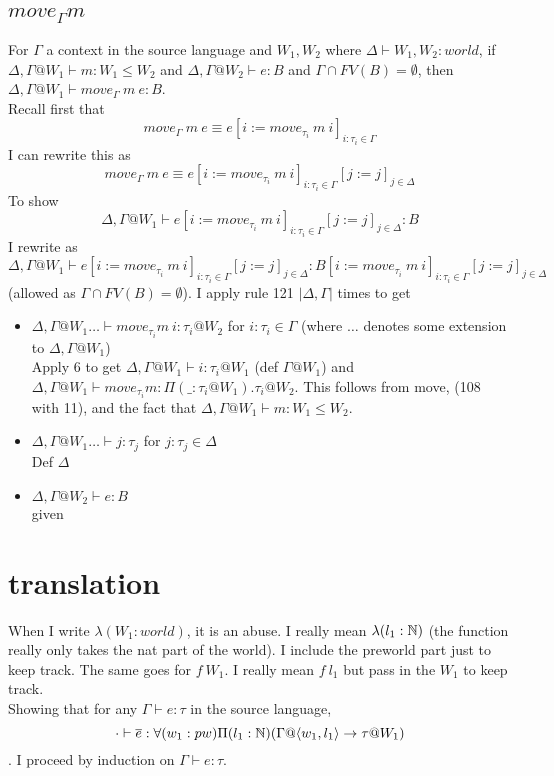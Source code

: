 \documentclass{article}
\begin{document}
\subsection*{$move_{\Gamma} m$}
For $\Gamma$ a context in the source language and $W_1, W_2$ where $\Delta \vdash W_1, W_2 : world$, if  $\Delta, \Gamma@W_1 \vdash m: W_1 \leq W_2$ and $\Delta, \Gamma@W_2 \vdash e : B$ and 
$\Gamma \cap FV(B) = \emptyset$,
then $\Delta, \Gamma @ W_1 \vdash move_{\Gamma} \:m \:e : B$.\\
Recall first that \[move_{\Gamma} \:m \:e \equiv
e[i := move_{\tau_i} \: m\: i]_{i: \tau_i \in \Gamma}
\]
I can rewrite this as 
\[move_{\Gamma} \:m \:e \equiv
e[i := move_{\tau_i} \: m\: i]_{i: \tau_i \in \Gamma}[j := j]_{j \in \Delta}
\]
To show
\[\Delta, \Gamma @ W_1 \vdash e[i := move_{\tau_i} \: m\: i]_{i: \tau_i \in \Gamma}[j := j]_{j \in \Delta} : B\]
I rewrite as
\[\Delta, \Gamma @ W_1 \vdash e[i := move_{\tau_i} \: m\: i]_{i: \tau_i \in \Gamma}[j := j]_{j \in \Delta} : B[i := move_{\tau_i} \: m\: i]_{i: \tau_i \in \Gamma}[j := j]_{j \in \Delta}\]
(allowed as $\Gamma \cap FV(B) = \emptyset$).
I apply rule 121 $|\Delta, \Gamma|$ times to get
\begin{itemize}
    \item $\Delta, \Gamma@W_1 \dots \vdash move_{\tau_i} m\:i : \tau_i @ W_2$ for $i: \tau_i \in \Gamma$
    (where $\dots$ denotes some extension to $\Delta, \Gamma@W_1$)\\
    Apply 6 to get $\Delta, \Gamma@W_1  \vdash i: \tau_i @ W_1$ (def $\Gamma@W_1$) and $\Delta, \Gamma@W_1  \vdash move_{\tau_i} m : \Pi(\_ : \tau_i@W_1).\tau_i @ W_2$. This follows from move, (108 with 11), and the fact that  $\Delta, \Gamma@W_1 \vdash m: W_1 \leq W_2$.
    \item $\Delta, \Gamma@W_1 \dots \vdash j : \tau_j$ for $j : \tau_j \in \Delta$\\
    Def $\Delta$
    \item $\Delta, \Gamma@W_2 \vdash e: B$\\
    given
\end{itemize}

\section*{translation}
When I write $\lambda (W_1: world)$, it is an abuse. I really mean $\lambda (l_1: \mathbb{N})$ (the function really only takes the nat part of the world). I include the preworld part just to keep track. The same goes for $f \: W_1$. I really mean $f \: l_1$ but pass in the $W_1$ to keep track.\\
Showing that for any $\Gamma \vdash e : \tau$ in the source language, 
\[\cdot \vdash \overline{e}: \forall(w_1: pw)\Pi(l_1: \mathbb{N})(\Gamma @ \langle w_1, l_1 \rangle \rightarrow \tau @ W_1)\]. I proceed by induction on $\Gamma \vdash e : \tau$.\\
\end{document}
